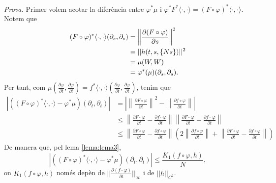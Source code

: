 {
\color{green!50!black}
\textit{Prova.} Primer volem acotar la diferència entre $\varphi^*\mu$ i $\varphi^*F^*\langle\cdot, \cdot\rangle = (F\circ\varphi)^*\langle\cdot, \cdot\rangle$. Notem que 
\begin{align*}
    (F\circ\varphi)^*\langle\cdot, \cdot\rangle(\partial_s, \partial_s) 
    &= \left\|\frac{\partial(F\circ\varphi)}{\partial s}\right\|^2
    \\
    &= ||h(t,s,\{Ns\})||^2
    \\
    &= \mu(W,W)
    \\
    &= \varphi^*(\mu)(\partial_s, \partial_s).
\end{align*}
Per tant, com $\mu\left(\frac{\partial\varphi}{\partial t},\frac{\partial\varphi}{\partial t}\right) = f^*\langle\cdot, \cdot\rangle\left(\frac{\partial\varphi}{\partial t},\frac{\partial\varphi}{\partial t}\right)$, tenim que
\begin{align*}
    |((F\circ\varphi)^*\langle\cdot, \cdot\rangle - \varphi^*\mu)(\partial_t, \partial_t)| 
    &= 
    \left|
    \left\|  \frac{\partial F\circ\varphi}{\partial t} \right\|^2 - \left\|\frac{\partial f\circ\varphi}{\partial t}\right\|
    \right|
    \\
    &\le \left\|\frac{\partial F\circ\varphi}{\partial t} - \frac{\partial f\circ\varphi}{\partial t}\right\|\left\|\frac{\partial F\circ\varphi}{\partial t} - \frac{\partial f\circ\varphi}{\partial t}\right\|
    \\
    &\le \left\|\frac{\partial F\circ\varphi}{\partial t} - \frac{\partial f\circ\varphi}{\partial t}\right\|\left(2\left\|\frac{\partial f\circ\varphi}{\partial t}\right\|+\left\|\frac{\partial F\circ\varphi}{\partial t} - \frac{\partial f\circ\varphi}{\partial t}\right\|\right)
\end{align*}
De manera que, pel lema \ref{lema:lema3},
\begin{equation*}
    |((F\circ\varphi)^*\langle\cdot, \cdot\rangle - \varphi^*\mu)(\partial_t, \partial_t)| \le \frac{K_1(f\circ\varphi,h)}{N},
\end{equation*}
on $K_1(f\circ\varphi,h)$ només depèn de $||\frac{\partial(f\circ\varphi)}{\partial t}||_\infty$ i de $||h||_{C^2}$. 

}
